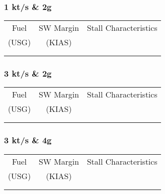 % 
% 
%
\subsubsection*{1 kt/s \& 2g}
  \begin{tabularx}{\textwidth}{|c|c|X|}
    \hline
    Fuel&SW Margin&Stall Characteristics\\
    (USG)&(KIAS)&\\
    \hline
    \hline
    &&\\
    \hline
    &&\\
    \hline
    \end{tabularx}     

\subsubsection*{3 kt/s \& 2g}
  \begin{tabularx}{\textwidth}{|c|c|X|}
    \hline
    Fuel&SW Margin&Stall Characteristics\\
    (USG)&(KIAS)&\\
    \hline
    \hline
    &&\\
    \hline
    &&\\
    \hline
    \end{tabularx}     

\subsubsection*{3 kt/s \& 4g}
  \begin{tabularx}{\textwidth}{|c|c|X|}
    \hline
    Fuel&SW Margin&Stall Characteristics\\
    (USG)&(KIAS)&\\
    \hline
    \hline
    &&\\
    \hline
    &&\\
    \hline
    \end{tabularx}     



   